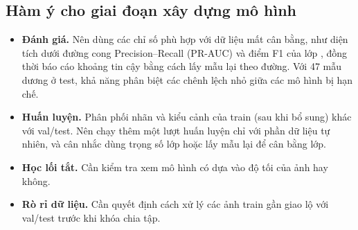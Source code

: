 \subsection{Hàm ý cho giai đoạn xây dựng mô hình}

\begin{itemize}
  \item \textbf{Đánh giá.} Nên dùng các chỉ số phù hợp với dữ liệu mất cân bằng, như diện tích dưới đường cong Precision--Recall (PR-AUC) và điểm F1 của lớp , đồng thời báo cáo khoảng tin cậy bằng cách lấy mẫu lại theo đường. Với 47 mẫu dương ở test, khả năng phân biệt các chênh lệch nhỏ giữa các mô hình bị hạn chế.
  \item \textbf{Huấn luyện.} Phân phối nhãn và kiểu cảnh của train (sau khi bổ sung) khác với val/test. Nên chạy thêm một lượt huấn luyện chỉ với phần dữ liệu tự nhiên, và cân nhắc dùng trọng số lớp hoặc lấy mẫu lại để cân bằng lớp.
  \item \textbf{Học lối tắt.} Cần kiểm tra xem mô hình có dựa vào độ tối của ảnh hay không.
  \item \textbf{Rò rỉ dữ liệu.} Cần quyết định cách xử lý các ảnh train gần giao lộ với val/test trước khi khóa chia tập.
\end{itemize}
